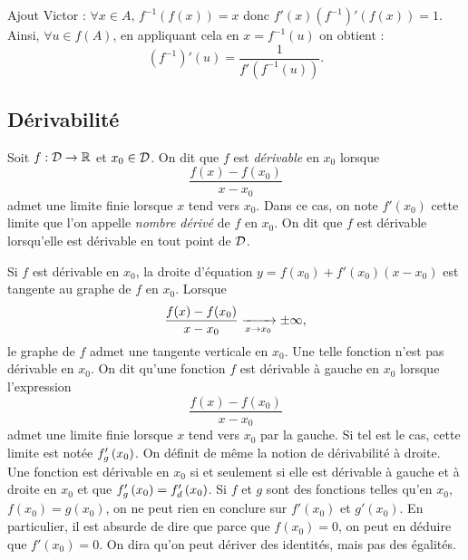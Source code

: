 \documentclass{magnoliaold}
\begin{document}
\begin{sol}
Ajout Victor : $\forall x \in A$, $f^{-1}(f(x))=x$ donc $f'(x)(f^{-1})'(f(x))=1$. Ainsi, $\forall u \in f(A)$, en appliquant cela en $x=f^{-1}(u)$ on obtient :
\[(f^{-1})'(u)=\frac{1}{f'(f^{-1}(u))}.\]
\end{sol}

\subsection{Dérivabilité}

\begin{definition}[utile=-3]
Soit $f:\mathcal{D}\to\mathbb{R}$ et $x_0\in\mathcal{D}$. On dit que $f$ est \emph{dérivable} en
$x_0$ lorsque
\[\frac{f(x)-f(x_0)}{x-x_0}\]
admet une limite finie lorsque $x$ tend vers $x_0$. Dans ce cas, on note $f'(x_0)$
cette limite que l'on appelle \emph{nombre dérivé} de $f$ en $x_0$.
On dit que $f$ est dérivable lorsqu'elle est dérivable en tout point de $\mathcal{D}$.
\end{definition}

\begin{remarques}
\remarque Si $f$ est dérivable en $x_0$, la droite d'équation
  $y=f(x_0)+f'(x_0)(x-x_0)$
  est tangente au graphe de $f$ en $x_0$.
\remarque Lorsque
  \[\frac{f(x)-f(x_0)}{x-x_0}\xrightarrow[x\rightarrow x_0]{}\pm\infty,\]
  le graphe de $f$ admet une tangente verticale en $x_0$. Une telle fonction n'est pas dérivable en $x_0$.
\remarque On dit qu'une fonction $f$ est dérivable à gauche en $x_0$ lorsque
  l'expression
  \[\frac{f(x)-f(x_0)}{x-x_0}\]
  admet une limite finie lorsque $x$ tend vers $x_0$ par la gauche. Si tel est le
  cas, cette limite est notée $f_g'\left(x_0\right)$. On définit de même la notion de
  dérivabilité à droite. Une fonction est dérivable en $x_0$ si et seulement si
  elle est dérivable à gauche et à droite en $x_0$ et que
  $f_g'\left(x_0\right)=f_d'\left(x_0\right)$.
\remarque Si $f$ et $g$ sont des fonctions telles qu'en $x_0$, $f(x_0)=g(x_0)$, on ne peut rien en conclure sur
  $f'(x_0)$ et $g'(x_0)$. En particulier, il est absurde de dire que parce que
  $f(x_0)=0$, on peut en déduire que $f'(x_0)=0$.
  On dira qu'on peut dériver des identités, mais pas des égalités.
\end{remarques}
\end{document}
